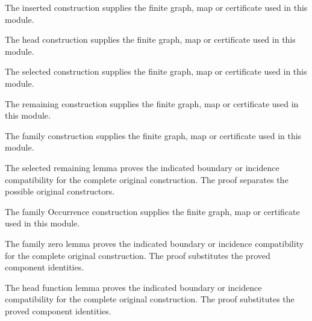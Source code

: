 The inserted construction supplies the finite graph, map or certificate used in this module.
\par{}

The head construction supplies the finite graph, map or certificate used in this module.
\par{}

The selected construction supplies the finite graph, map or certificate used in this module.
\par{}

The remaining construction supplies the finite graph, map or certificate used in this module.
\par{}

The family construction supplies the finite graph, map or certificate used in this module.
\par{}

The selected remaining lemma proves the indicated boundary or incidence compatibility for the complete original construction.
The proof separates the possible original constructors.
\par{}

The family Occurrence construction supplies the finite graph, map or certificate used in this module.
\par{}

The family zero lemma proves the indicated boundary or incidence compatibility for the complete original construction.
The proof substitutes the proved component identities.
\par{}

The head function lemma proves the indicated boundary or incidence compatibility for the complete original construction.
The proof substitutes the proved component identities.
\par{}

